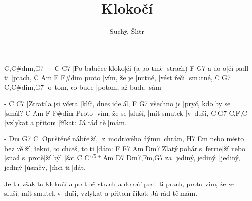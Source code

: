 \documentclass{song}
\title{Klokočí}
\author{Suchý, Šlitr}
\newcommand{\aug}{\ensuremath{^{7/5+}}}
\begin{document}
\strophe
C,C\#dim,G7
|
-                C              C7
|Po babičce kloko|čí (a po tmě |strach)
      F           G7
a do o|čí padl ti |prach,
      C           Am      F          F\#dim
proto |vím, že je |nutné, |vést řeči |smutné,
C               G7              C,C\#dim,G7
|o~tom, co bude |potom, až budu |sám.
\endstrophe

\strophe
-                   C              C7
|Ztratila jsi včera |klíč, dnes ide|ál,
           F                G7
všechno je |pryč, kdo by se |smál?
      C           Am      F           F\#dim
Proto |vím, že se |sluší, |mít smutek |v~duši,
C                 G7                C,F,C
|vzlykat a přitom |říkat: Já rád tě |mám.
\endstrophe

\strophe
-              Dm   G7                C
|Opuštěné nábře|ží, |z~modravého dýmu |chrám,
                 H7                          Em
nebo město bez vě|ží, řekni, co chceš, to ti |dám:
                   F        E7          Am      Dm7
Zlatý pohár s~ferme|ží nebo |snad s~protě|ží býl |šat
   C                C\aug           Am      D7       Dm7,Fm,G7
za |jediný, jediný, |jediný, jediný |úsměv, |chci ti |dát.
\endstrophe

\strophe*
Je tu však to klokočí a po tmě strach
a do očí padl ti prach,
proto vím, že se sluší, mít smutek v~duši,
vzlykat a přitom říkat: Já rád tě mám.
\endstrophe

\end{document}

